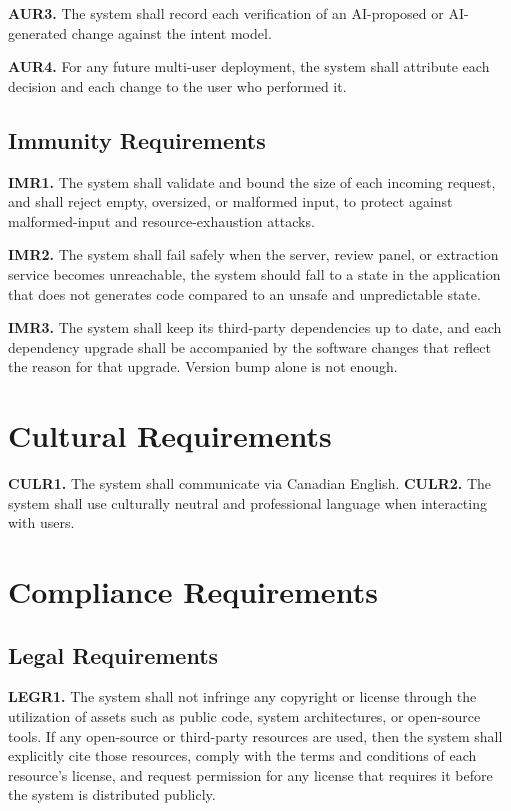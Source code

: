 \documentclass[12pt]{article}
\begin{document}
\medskip
\noindent\textbf{AUR3.} The system shall record each verification of an
AI-proposed or AI-generated change against the intent model.

\medskip
\noindent\textbf{AUR4.} For any future multi-user deployment, the system shall
attribute each decision and each change to the user who performed it.

\subsection{Immunity Requirements}

\medskip
\noindent\textbf{IMR1.} The system shall validate and bound the size of each
incoming request, and shall reject empty, oversized, or malformed input, to
protect against malformed-input and resource-exhaustion attacks.

\medskip
\noindent\textbf{IMR2.} The system shall fail safely when the server, review
panel, or extraction service becomes unreachable, the system should fall to a state in the application that
does not generates code compared to an unsafe and unpredictable state. 

\medskip
\noindent\textbf{IMR3.} The system shall keep its third-party dependencies up to date, and each dependency upgrade shall be accompanied by the software changes that reflect the reason for that upgrade.
Version bump alone is not enough. 

\section{Cultural Requirements}
\noindent\textbf{CULR1.} The system shall communicate via Canadian English. 
\medskip
\noindent\textbf{CULR2.} The system shall use culturally neutral and professional language when interacting with users.

\section{Compliance Requirements}
\subsection{Legal Requirements}
\medskip
\noindent\textbf{LEGR1.} The system shall not infringe any copyright or license through the utilization of assets such as public code, system architectures, or open-source tools.
If any open-source or third-party resources are used, then the system shall explicitly cite those resources, comply with the terms and conditions of each resource's license, and request permission for any license that requires it before the system is distributed publicly.
\end{document}
